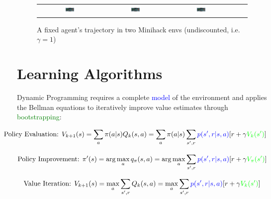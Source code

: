 \documentclass[12pt]{article}
\begin{document}
\begin{figure}[!h]
\begin{tabular}{ccccc}
		\includegraphics[width=0.18\textwidth]{figures/room-with-lava_FixedAgent/7.png} &
		\includegraphics[width=0.18\textwidth]{figures/room-with-lava_FixedAgent/8.png} &
		\includegraphics[width=0.18\textwidth]{figures/room-with-lava_FixedAgent/9.png}
	\end{tabular}
	\caption[A fixed agent's trajectory in two Minihack environments]{A fixed agent's trajectory in two Minihack envs (undiscounted, i.e. $\gamma = 1$)}
	\label{fig:room-with-lava_FixedAgent}
\end{figure}



\section{Learning Algorithms}

Dynamic Programming requires a complete \textcolor{blue}{model} of the environment and applies the
Bellman equations to iteratively improve value estimates through \textcolor{green}{bootstrapping}:

\begin{equation}
	\hspace{-20pt}
	\text{Policy Evaluation: } V_{k+1}(s)
	= \sum_a \pi(a|s) Q_k(s, a)
	= \sum_a \pi(a|s) \sum_{s',r} \textcolor{blue}{p(s',r|s,a)} [r + \gamma \textcolor{green}{V_k(s')}]
\end{equation}

\begin{equation}
	\text{Policy Improvement: } \pi'(s)
	= \arg\max_a q_\pi(s, a)
	= \arg\max_a \sum_{s',r} \textcolor{blue}{p(s',r|s,a)} [r + \gamma \textcolor{green}{V_\pi(s')}]
\end{equation}

\begin{equation}
	\text{Value Iteration: } V_{k+1}(s)
	= \max_a \sum_{s',r} Q_k(s, a)
	= \max_a \sum_{s',r} \textcolor{blue}{p(s',r|s,a)} [r + \gamma \textcolor{green}{V_k(s')}]
\end{equation}
\end{document}
